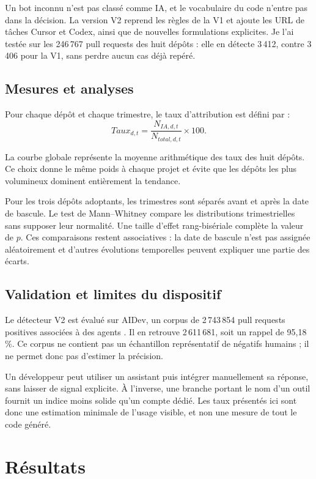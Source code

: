 \documentclass[12pt,a4paper,oneside]{report}
\newcommand{\taux}[1]{#1\,\%}
\begin{document}
Un bot inconnu n'est pas classé comme IA, et le vocabulaire du code n'entre pas dans la décision. La version V2 reprend les règles de la V1 et ajoute les URL de tâches Cursor et Codex, ainsi que de nouvelles formulations explicites. Je l'ai testée sur les 246\,767 pull requests des huit dépôts : elle en détecte 3\,412, contre 3\,406 pour la V1, sans perdre aucun cas déjà repéré.

\section{Mesures et analyses}

Pour chaque dépôt et chaque trimestre, le taux d'attribution est défini par :
\[
Taux_{d,t}=\frac{N_{IA,d,t}}{N_{total,d,t}}\times 100.
\]

La courbe globale représente la moyenne arithmétique des taux des huit dépôts. Ce choix donne le même poids à chaque projet et évite que les dépôts les plus volumineux dominent entièrement la tendance.

Pour les trois dépôts adoptants, les trimestres sont séparés avant et après la date de bascule. Le test de Mann--Whitney compare les distributions trimestrielles sans supposer leur normalité. Une taille d'effet rang-bisériale complète la valeur de $p$. Ces comparaisons restent associatives : la date de bascule n'est pas assignée aléatoirement et d'autres évolutions temporelles peuvent expliquer une partie des écarts.

\section{Validation et limites du dispositif}

Le détecteur V2 est évalué sur AIDev, un corpus de 2\,743\,854 pull requests positives associées à des agents \parencite{aidev2026}. Il en retrouve 2\,611\,681, soit un rappel de \taux{95,18}. Ce corpus ne contient pas un échantillon représentatif de négatifs humains ; il ne permet donc pas d'estimer la précision.

Un développeur peut utiliser un assistant puis intégrer manuellement sa réponse, sans laisser de signal explicite. À l'inverse, une branche portant le nom d'un outil fournit un indice moins solide qu'un compte dédié. Les taux présentés ici sont donc une estimation minimale de l'usage visible, et non une mesure de tout le code généré.

\chapter{Résultats}
\end{document}
